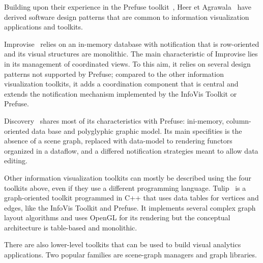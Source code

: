 Building upon their experience in the Prefuse toolkit~\cite{Prefuse},
Heer et Agrawala~\cite{DesignPatternsIV} have derived software design
patterns that are common to information visualization applications and
toolkits. 

Improvise~\cite{Improvise} relies on an in-memory database with
notification that is row-oriented and its visual structures are
monolithic.  The main characteristic of Improvise lies in its
management of coordinated views.  To this aim, it relies on several
design patterns not supported by Prefuse; compared to the other
information visualization toolkits, it adds a coordination component
that is central and extends the notification mechanism implemented
by the InfoVis Toolkit or Prefuse.

Discovery~\cite{Discovery1,Discovery2,Discovery3} shares most of its characteristics with Prefuse:
ini-memory, column-oriented data base and polyglyphic graphic model. Its main specifities is the absence of a scene graph, 
replaced with data-model to rendering functors organized in a dataflow, and a differed notification strategies meant to allow 
data editing.


Other information visualization toolkits can mostly be described using
the four toolkits above, even if they use a different programming
language.  Tulip~\cite{Tulip} is a graph-oriented toolkit programmed in C++ that
uses data tables for vertices and edges, like the InfoVis Toolkit and
Prefuse.  It implements several complex graph layout algorithms and
uses OpenGL for its rendering but the conceptual architecture is
table-based and monolithic.

There are also lower-level toolkits that can be used to build visual
analytics applications.  Two popular families are scene-graph managers
and graph libraries.

